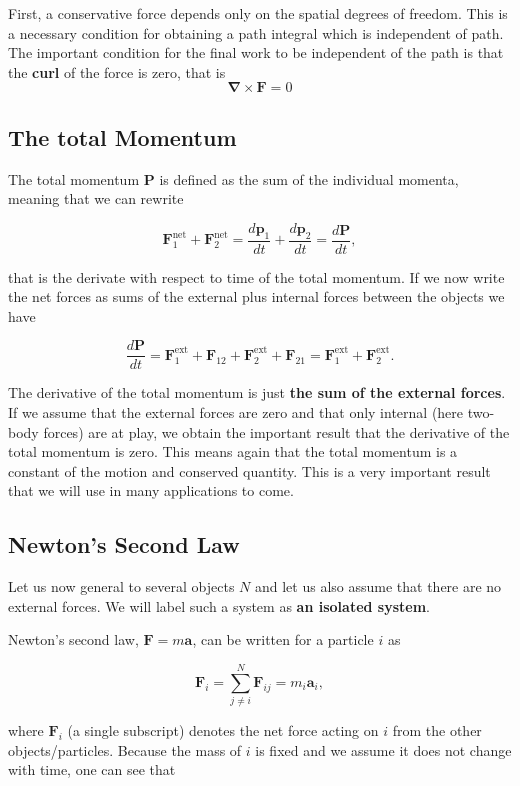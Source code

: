\documentclass[%
oneside,                 %
final,                   %
10pt]{article}
\begin{document}
First, a conservative force depends only on the spatial degrees of freedom. This is a necessary condition for obtaining a path integral which is independent of path.
The  important condition for the final work to be independent of the path is that the \textbf{curl} of the force is zero, that
is
\[
\bm{\nabla} \times \bm{F}=0
\]

\subsection{The total Momentum}

The total momentum $\bm{P}$ is defined as the sum of the individual momenta, meaning that we can rewrite

\[
\bm{F}_1^{\mathrm{net}}+\bm{F}_2^{\mathrm{net}}=\frac{d\bm{p}_1}{dt}+\frac{d\bm{p}_2}{dt}=\frac{d\bm{P}}{dt},
\]

that is the derivate with respect to time of the total momentum. If we now
write the net forces as sums of the external plus internal forces
between the objects we have

\[
\frac{d\bm{P}}{dt}=\bm{F}_1^{\mathrm{ext}}+\bm{F}_{12}+\bm{F}_2^{\mathrm{ext}}+\bm{F}_{21}=\bm{F}_1^{\mathrm{ext}}+\bm{F}_2^{\mathrm{ext}}.
\]

The derivative of the total momentum is just \textbf{the sum of the external
forces}. If we assume that the external forces are zero and that only
internal (here two-body forces) are at play, we obtain the important
result that the derivative of the total momentum is zero. This means
again that the total momentum is a constant of the motion and
conserved quantity. This is a very important result that we will use
in many applications to come.

\subsection{Newton's Second Law}

Let us now general to several objects $N$ and let us also assume that there are no external forces. We will label such a system as \textbf{an isolated system}. 

Newton's second law, $\bm{F}=m\bm{a}$, can be written for a particle $i$ as

\begin{equation}
\bm{F}_i=\sum_{j\ne i}^N \bm{F}_{ij}=m_i\bm{a}_i,
\end{equation}

where $\bm{F}_i$ (a single subscript) denotes the net force acting on $i$ from the other objects/particles.
Because the mass of $i$ is fixed and we assume it does not change with time, one can see that
\end{document}
